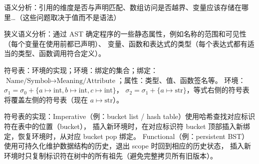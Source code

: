 \par \noindent 语义分析：引用的维度是否与声明匹配、数组访问是否越界、变量应该存储在哪里\dots（这些问题取决于值而不是语法）
\par \noindent 狭义语义分析：通过 AST 确定程序的一些静态属性，例如名称的范围和可见性（每个变量在使用前都已声明）、
变量、函数和表达式的类型（每个表达式都有适当的类型、函数调用符合定义）。

\par \noindent 符号表：环境的实现；环境：绑定的集合；绑定：$\text{Name/Symbol} \mapsto \text{Meaning/Attribute}$；属性：类型、值、函数签名等。
环境：$\sigma_1 = \sigma_0 + \{a \mapsto \text{int}, b \mapsto \text{int}, c \mapsto \text{int}\}$，
$\sigma_2 = \sigma_1 + \{a \mapsto \text{str}\}$，等式右侧的符号表将覆盖左侧的符号表（现在 $a \mapsto \text{str}$）。

\par \noindent 符号表的实现：Imperative（例：bucket list / hash table）使用哈希查找对应标识符在表中的位置（bucket），
插入新环境时，在对应标识符 bucket 顶部插入新绑定，恢复环境时，从对应 bucket pop 绑定。
Functional（例：persistent BST）使用可持久化维护数据结构的历史，退出 scope 时回到相应的历史状态，
插入新环境时只复制标识符在树中的所有祖先（避免完整拷贝所有旧版本）。